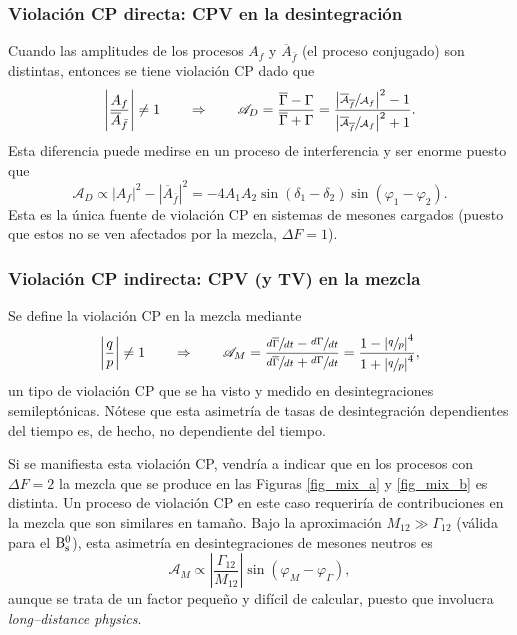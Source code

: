 \subsubsection{Violación CP directa: CPV en la desintegración} %
\label{sec_CPVdesint}

Cuando las amplitudes de los procesos $A_f$ y $\overline{A}_{\bar f}$ (el proceso conjugado)  son distintas, entonces se tiene violación CP dado que \cite{pdg2018}
\begin{equation*}
\left| \frac{A_f}{\overline{A}_{\bar f}} \right| \neq 1 \qquad \Rightarrow \qquad \mathscr{A} _D = \frac{\overline{\Gamma}-\Gamma}{\overline{\Gamma}+\Gamma}=\frac{ \left| \sfrac{\overline{\mathcal{A}}_{\overline{f}}}{\mathcal{A}_f} \right|^2 -1 }{\left| \sfrac{\overline{\mathcal{A}}_{\overline{f}}}{\mathcal{A}_f} \right|^2 +1}.
\end{equation*}
%
Esta diferencia puede medirse en un proceso de interferencia y ser enorme puesto que 
\begin{equation}
\mathscr{A}_D \propto |A_f|^2 - |\overline{A}_{\overline{f}}|^2 = -4A_1A_2 \sin(\delta_1 - \delta_2) \sin (\varphi_1 - \varphi_2).	\label{eqinferf1}
\end{equation}
\color{vero} Esta \color{norm} es la única fuente de violación CP en sistemas de mesones cargados (puesto que estos no se ven afectados por la mezcla, $\Delta F = 1$).



\subsubsection{Violación CP indirecta: CPV (y TV) en la mezcla} %
\label{sec_CPVmixing}

\color{vero} Se define la violación CP en la mezcla mediante \cite{pdg2018}\color{rem}
\begin{equation}
 \left| \frac{q}{p} \right| \neq 1	\qquad \Rightarrow \qquad \mathscr{A}_M = \frac{\sfrac{d\overline{\Gamma}}{dt}-\sfrac{d\Gamma}{dt}}{\sfrac{d\overline{\Gamma}}{dt}+\sfrac{d\Gamma}{dt}}  =  \frac{1- \left| \sfrac{q}{p} \right|^4}{1+ \left| \sfrac{q}{p} \right|^4},
\end{equation} 
un tipo de violación CP que se ha visto y medido en desintegraciones semileptónicas. Nótese que esta asimetría de tasas de desintegración dependientes del tiempo es, de hecho, no dependiente del tiempo.  \color{norm}

Si se manifiesta esta violación CP, vendría a indicar que en los procesos con $\Delta F = 2$ la mezcla que se produce en las Figuras \ref{fig_mix_a} y \ref{fig_mix_b} es distinta. Un proceso de violación CP en este caso requeriría de contribuciones en \color{vero} la mezcla \color{norm} que son similares en tamaño. Bajo la aproximación $M_{12} \gg \Gamma_{12}$ (válida para el $\mathrm{B}{}_{\mathrm{s}}^{0}$), esta asimetría en desintegraciones de mesones neutros es
\begin{equation}
\mathscr{A}_M \propto \left| \frac{\Gamma_{12}}{M_{12}} \right| \sin (\varphi_M - \varphi_{\Gamma}),	
\end{equation}
aunque se trata de un factor pequeño y difícil de calcular, puesto que involucra \emph{long--distance physics}.



